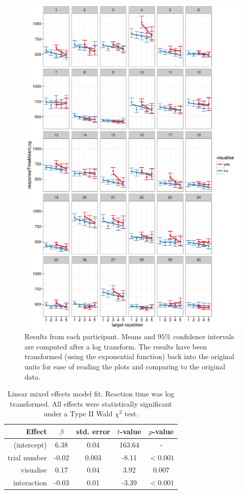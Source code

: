 \documentclass[smallextended]{svjour3}       %
\begin{document}
\begin{figure}
\centering
\includegraphics[width=12cm]{figs/indivResults.pdf}
\caption{Results from each participant. Means and $95\%$ confidence intervals are computed after a log transform. The results have been transformed (using the exponential function) back into the original units for ease of reading the plots and comparing to the original data.}
\label{fig:indivResults}
\end{figure}

\begin{table}
\centering
\small
\caption{Linear mixed effects model fit. Reaction time was log transformed. All effects were statistically significant under a Type II Wald $\chi^2$ test.}
\label{tab:lmerResults}
\begin{tabular}{r|cccc}
 	Effect	& $\beta$ & std. error &  $t$-value 	& $p$-value\\
 	\hline
 	(intercept) 	& 6.38 		& 0.04 	& 163.64 	& - \\
 	trial number 	& -0.02 	& 0.003 & -8.11 	&$<0.001$\\
 	visualise 		& 0.17		& 0.04	& 3.92 		&$0.007$\\
 	interaction		& -0.03 	& 0.01	& -3.39 	&$<0.001$\\
\end{tabular}
\end{table}
\end{document}
